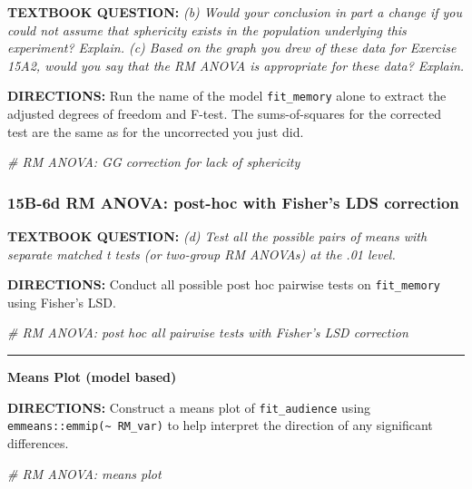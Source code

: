 \documentclass[
]{article}
\newenvironment{Shaded}{\begin{snugshade}}{\end{snugshade}}
\newcommand{\CommentTok}[1]{\textcolor[rgb]{0.56,0.35,0.01}{\textit{#1}}}
\begin{document}
\textbf{TEXTBOOK QUESTION:} \emph{(b) Would your conclusion in part a
change if you could not assume that sphericity exists in the population
underlying this experiment? Explain. (c) Based on the graph you drew of
these data for Exercise 15A2, would you say that the RM ANOVA is
appropriate for these data? Explain.}

\textbf{DIRECTIONS:} Run the name of the model \texttt{fit\_memory}
alone to extract the adjusted degrees of freedom and F-test. The
sums-of-squares for the corrected test are the same as for the
uncorrected you just did.

\begin{Shaded}
\begin{Highlighting}[]
\CommentTok{# RM ANOVA: GG correction for lack of sphericity}
\end{Highlighting}
\end{Shaded}

\clearpage

\hypertarget{b-6d-rm-anova-post-hoc-with-fishers-lds-correction}{%
\subsubsection{15B-6d RM ANOVA: post-hoc with Fisher's LDS
correction}\label{b-6d-rm-anova-post-hoc-with-fishers-lds-correction}}

\textbf{TEXTBOOK QUESTION:} \emph{(d) Test all the possible pairs of
means with separate matched t tests (or two-group RM ANOVAs) at the .01
level.}

\textbf{DIRECTIONS:} Conduct all possible post hoc pairwise tests on
\texttt{fit\_memory} using Fisher's LSD.

\begin{Shaded}
\begin{Highlighting}[]
\CommentTok{# RM ANOVA: post hoc all pairwise tests with Fisher's LSD correction}
\end{Highlighting}
\end{Shaded}

\begin{center}\rule{0.5\linewidth}{\linethickness}\end{center}

\textbf{Means Plot (model based)}

\textbf{DIRECTIONS:} Construct a means plot of \texttt{fit\_audience}
using \texttt{emmeans::emmip(\textasciitilde{}\ RM\_var)} to help
interpret the direction of any significant differences.

\begin{Shaded}
\begin{Highlighting}[]
\CommentTok{# RM ANOVA: means plot}
\end{Highlighting}
\end{Shaded}
\end{document}
